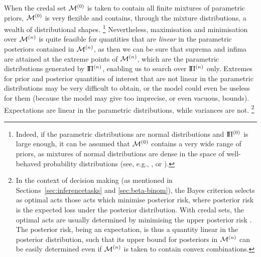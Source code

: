 When the credal set $\mathcal{M}^{(0)}$ is taken to contain all finite mixtures of parametric priors,
$\mathcal{M}^{(0)}$ is very flexible and contains, through the mixture distributions, a wealth of distributional shapes.%
\footnote{\label{foot:denseinthespaceof}Indeed, if the parametric distributions are normal distributions
and $\text{I}\!\Pi^{(0)}$ is large enough,
it can be assumed that $\mathcal{M}^{(0)}$ contains a very wide range of priors,
as mixtures of normal distributions are dense in the space of well-behaved probability distributions
(see, e.g., \cite[p.~44]{2000:priebe}, or \cite{1983:ferguson}).}
Nevertheless, maximisation and minimisation over $\mathcal{M}^{(n)}$
is quite feasible for quantities that are \emph{linear} in the parametric posteriors contained in $\mathcal{M}^{(n)}$,
as then we can be sure that suprema and infima are attained at the extreme points of $\mathcal{M}^{(n)}$,
which are the parametric distributions generated by $\text{I}\!\Pi^{(n)}$, enabling us to search over $\text{I}\!\Pi^{(n)}$ only.
Extremes for prior and posterior quantities of interest that are not linear in the parametric distributions
may be very difficult to obtain,
or the model could even be useless for them (because the model may give too imprecise, or even vacuous, bounds).
Expectations are linear in the parametric distributions, while variances are not.%
\footnote{In the context of decision making (as mentioned in Sections~\ref{sec:inferencetasks} and \ref{sec:beta-binom}),
the Bayes criterion selects as optimal acts those acts which minimise posterior risk,
where posterior risk is the expected loss under the posterior distribution.
With credal sets, the optimal acts are usually determined by minimising the upper posterior risk
\parencite[see, e.g.,][\S 3.2]{itip-decision}.
The posterior risk, being an expectation, is thus a quantity linear in the posterior distribution,
such that its upper bound for posteriors in $\mathcal{M}^{(n)}$ can be easily determined
even if $\mathcal{M}^{(n)}$ is taken to contain convex combinations.} %

%


